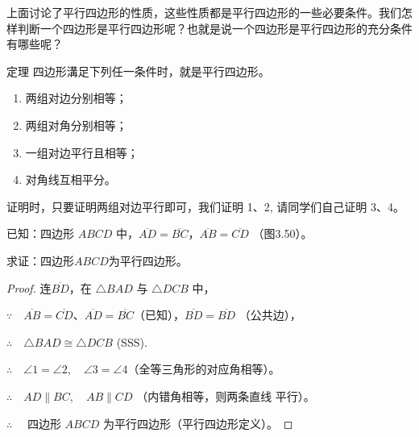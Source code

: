 上面讨论了平行四边形的性质，这些性质都是平行四边形的一些必要条件。我们怎样判断一个四边形是平行四边形呢？也就是说一个四边形是平行四边形的充分条件有哪些呢？

\begin{Theorem}[平行四边形判定定理]{定理} 
四边形溝足下列任一条件时，就是平行四边形。
\begin{enumerate}
  \item 两组对边分别相等；
  \item 两组对角分别相等；
  \item 一组对边平行且相等；
  \item 对角线互相平分。
\end{enumerate}
\end{Theorem}

证明时，只要证明两组对边平行即可，我们证明 1、2, 请同学们自己证明 3、4。

已知：四边形 $ABCD$ 中，$\overline{AD}=\overline{BC}$，$\overline{AB}=\overline{CD}$ （图3.50）。

求证：四边形$ABCD$为平行四边形。

\begin{proof}
连$\overline{BD}$，在 $\triangle BAD$ 与 $\triangle DCB$ 中，

$\because\quad \overline{AB}=\overline{CD}$、$\overline{AD}=\overline{BC}$（已知），$\overline{BD}=\overline{BD}$ （公共边），

$\therefore\quad \triangle BAD\cong \triangle DCB$ (SSS).

$\therefore\quad \angle 1=\angle 2,\quad \angle 3=\angle 4$（全等三角形的对应角相等）。

$\therefore\quad AD\parallel BC,\quad AB\parallel CD$ （内错角相等，则两条直线
平行）。

$\therefore\quad$ 四边形 $ABCD$ 为平行四边形（平行四边形定义）。
\end{proof}

\begin{figure}
    \begin{minipage}[t]{0.48\linewidth}
    \centering
\begin{tikzpicture}[>=latex, scale=1]
    \end{tikzpicture}
    \caption{}
    \end{minipage}
    \begin{minipage}[t]{0.48\linewidth}
    \centering
    \begin{tikzpicture}[>=latex, scale=1]
    \end{tikzpicture}
    \caption{}
    \end{minipage}
    \end{figure}

